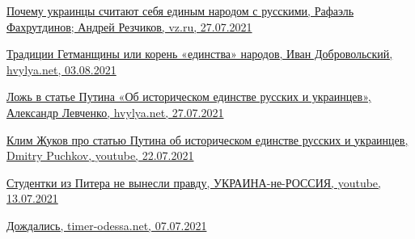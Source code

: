 \href{https://vz.ru/world/2021/7/27/1111068.html}{%
Почему украинцы считают себя единым народом с русскими, Рафаэль Фахрутдинов; Андрей Резчиков, vz.ru, 27.07.2021%
%
}

\href{https://analytics.hvylya.net/235008-tradicii-getmanshchiny-ili-koren-edinstva-narodov}{%
Традиции Гетманщины или корень «единства» народов, Иван Добровольский, hvylya.net, 03.08.2021%
}

\href{https://analytics.hvylya.net/234552-lozh-v-state-putina-o-istoricheskom-edinstve-russkih-i-ukraincev}{%
Ложь в статье Путина «Об историческом единстве русских и украинцев», Александр Левченко, hvylya.net, 27.07.2021%
}

\href{https://www.youtube.com/watch?v=QnS-8kiyPUw}{%
Клим Жуков про статью Путина об историческом единстве русских и украинцев, Dmitry Puchkov,  youtube, 22.07.2021%
}

\href{https://www.youtube.com/watch?v=Bfu53UbqJf8}{%
Студентки из Питера не вынесли правду, УКРАИНА-не-РОССИЯ, youtube, 13.07.2021%
}

\href{https://timer-odessa.net/minds/dozhdalis_552.html}{%
Дождались, timer-odessa.net, 07.07.2021%
}
